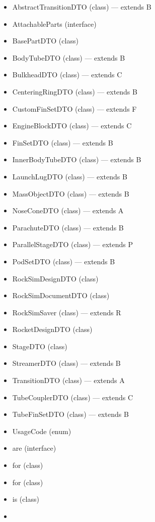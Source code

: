 \documentclass{amsdtx}
\begin{document}
\begin{itemize}
\begin{itemize}
\begin{itemize}
    \item
      AbstractTransitionDTO (class) --- extends B
    \item
      AttachableParts (interface)
    \item
      BasePartDTO (class)
    \item
      BodyTubeDTO (class) --- extends B
    \item
      BulkheadDTO (class) --- extends C
    \item
      CenteringRingDTO (class) --- extends B
    \item
      CustomFinSetDTO (class) --- extends F
    \item
      EngineBlockDTO (class) --- extends C
    \item
      FinSetDTO (class) --- extends B
    \item
      InnerBodyTubeDTO (class) --- extends B
    \item
      LaunchLugDTO (class) --- extends B
    \item
      MassObjectDTO (class) --- extends B
    \item
      NoseConeDTO (class) --- extends A
    \item
      ParachuteDTO (class) --- extends B
    \item
      ParallelStageDTO (class) --- extends P
    \item
      PodSetDTO (class) --- extends B
    \item
      RockSimDesignDTO (class)
    \item
      RockSimDocumentDTO (class)
    \item
      RockSimSaver (class) --- extends R
    \item
      RocketDesignDTO (class)
    \item
      StageDTO (class)
    \item
      StreamerDTO (class) --- extends B
    \item
      TransitionDTO (class) --- extends A
    \item
      TubeCouplerDTO (class) --- extends C
    \item
      TubeFinSetDTO (class) --- extends B
    \item
      UsageCode (enum)
    \item
      are (interface)
    \item
      for (class)
    \item
      for (class)
    \item
      is (class)
    \item

\end{itemize}
\end{itemize}
\end{itemize}
\end{document}

